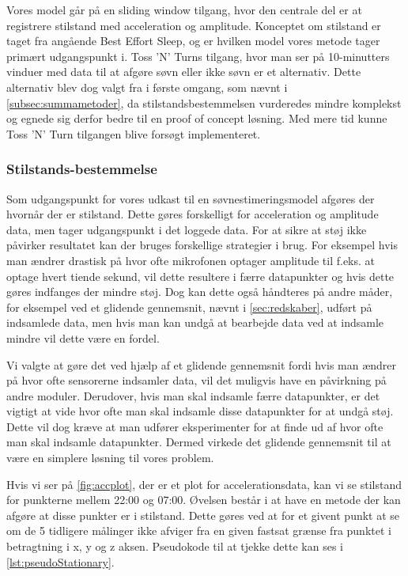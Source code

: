 Vores model går på en sliding window tilgang, hvor den centrale del er at registrere stilstand med acceleration og amplitude.
Konceptet om stilstand er taget fra \citet{6563918} angående Best Effort Sleep, og er hvilken model vores metode tager primært udgangspunkt i.
Toss 'N' Turns tilgang, hvor man ser på 10-minutters vinduer med data til at afgøre søvn eller ikke søvn er et alternativ.
Dette alternativ blev dog valgt fra i første omgang, som nævnt i \cref{subsec:summametoder}, da stilstandsbestemmelsen vurderedes mindre komplekst og egnede sig derfor bedre til en proof of concept løsning.
Med mere tid kunne Toss 'N' Turn tilgangen blive forsøgt implementeret.

\subsubsection{Stilstands-bestemmelse}
Som udgangspunkt for vores udkast til en søvnestimeringsmodel afgøres der hvornår der er stilstand.
Dette gøres forskelligt for acceleration og amplitude data, men tager udgangspunkt i det loggede data.
For at sikre at støj ikke påvirker resultatet kan der bruges forskellige strategier i brug. 
For eksempel hvis man ændrer drastisk på hvor ofte mikrofonen optager amplitude til f.eks. at optage hvert tiende sekund, vil dette resultere i færre datapunkter og hvis dette gøres indfanges der mindre støj.
Dog kan dette også håndteres på andre måder, for eksempel ved et glidende gennemsnit, nævnt i \cref{sec:redskaber}, udført på indsamlede data, men hvis man kan undgå at bearbejde data ved at indsamle mindre vil dette være en fordel.

Vi valgte at gøre det ved hjælp af et glidende gennemsnit fordi hvis man ændrer på hvor ofte sensorerne indsamler data, vil det muligvis have en påvirkning på andre moduler.
Derudover, hvis man skal indsamle færre datapunkter, er det vigtigt at vide hvor ofte man skal indsamle disse datapunkter for at undgå støj.
Dette vil dog kræve at man udfører eksperimenter for at finde ud af hvor ofte man skal indsamle datapunkter.
Dermed virkede det glidende gennemsnit til at være en simplere løsning til vores problem.

Hvis vi ser på \cref{fig:accplot}, der er et plot for accelerationsdata, kan vi se stilstand for punkterne mellem 22:00 og 07:00.
Øvelsen består i at have en metode der kan afgøre at disse punkter er i stilstand.
Dette gøres ved at for et givent punkt at se om de 5 tidligere målinger ikke afviger fra en given fastsat grænse fra punktet i betragtning i x, y og z aksen.
Pseudokode til at tjekke dette kan ses i \cref{lst:pseudoStationary}.

